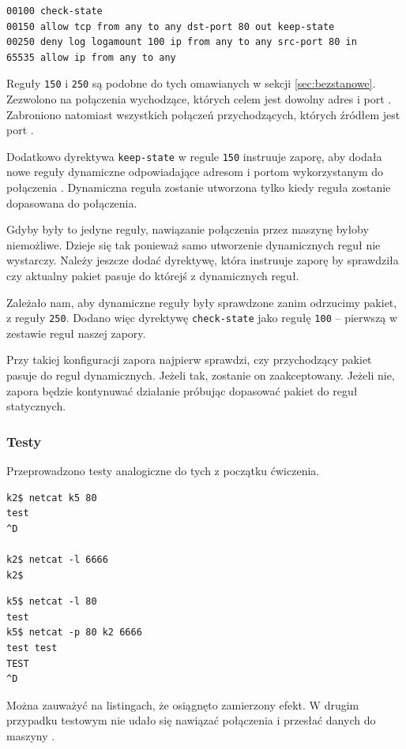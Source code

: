 \begin{lstlisting}
00100 check-state
00150 allow tcp from any to any dst-port 80 out keep-state
00250 deny log logamount 100 ip from any to any src-port 80 in
65535 allow ip from any to any
\end{lstlisting}

Reguły \texttt{150} i \texttt{250} są podobne do tych omawianych w sekcji
\ref{sec:bezstanowe}. Zezwolono na połączenia \tcp{} wychodzące, których celem
jest dowolny adres i port \pos. Zabroniono natomiast wszystkich połączeń
przychodzących, których źródłem jest port \pos.

Dodatkowo dyrektywa \texttt{keep-state} w regule \texttt{150} instruuje zaporę,
aby dodała nowe reguły dynamiczne odpowiadające adresom i portom wykorzystanym
do połączenia \cite{bsd:firewall}. Dynamiczna reguła zostanie utworzona tylko
kiedy reguła zostanie dopasowana do połączenia.

Gdyby były to jedyne reguły, nawiązanie połączenia \tcp{} przez maszynę \kdwa{}
byłoby niemożliwe. Dzieje się tak ponieważ samo utworzenie dynamicznych reguł
nie wystarczy. Należy jeszcze dodać dyrektywę, która instruuje zaporę by
sprawdziła czy aktualny pakiet pasuje do którejś z dynamicznych reguł.

Zależało nam, aby dynamiczne reguły były sprawdzone zanim odrzucimy pakiet, z
reguły \texttt{250}. Dodano więc dyrektywę \texttt{check-state} jako regułę
\texttt{100} -- pierwszą w zestawie reguł naszej zapory.

Przy takiej konfiguracji zapora najpierw sprawdzi, czy przychodzący pakiet
pasuje do reguł dynamicznych. Jeżeli tak, zostanie on zaakceptowany. Jeżeli nie,
zapora będzie kontynuwać działanie próbując dopasować pakiet do reguł
statycznych.


\subsubsection{Testy}

Przeprowadzono testy analogiczne do tych z początku ćwiczenia.

\begin{minipage}[b]{0.4\linewidth}
\begin{lstlisting}[caption={\kdwa{}}]
k2$ netcat k5 80
test
^D

k2$ netcat -l 6666
k2$
\end{lstlisting}
\end{minipage}
\begin{minipage}[b]{0.12\linewidth}
  \hfill\vspace{1cm}
\end{minipage}
\begin{minipage}[b]{0.4\linewidth}
\begin{lstlisting}[caption={\kpiec{}}]
k5$ netcat -l 80
test
k5$ netcat -p 80 k2 6666
test test
TEST
^D
\end{lstlisting}
\end{minipage}

Można zauważyć na listingach, że osiągnęto zamierzony efekt. W drugim przypadku
testowym nie udało się nawiązać połączenia i przesłać danych do maszyny \kdwa.
